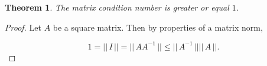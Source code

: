 \documentclass[12pt]{article}
\newtheorem{thm}{Theorem}
\begin{document}
\begin{thm}
The matrix condition number is greater or equal $1$.
\end{thm}
\begin{proof}
Let $ A$ be a square matrix. Then by properties of a matrix norm,

$$1=\vert\vert\,I\,\vert\vert =\vert\vert\,A A^{-1}\,\vert\vert  \leq \vert\vert\,A^{-1}\,\vert\vert \vert\vert\,A\,\vert\vert.$$
\end{proof}
\end{document}
